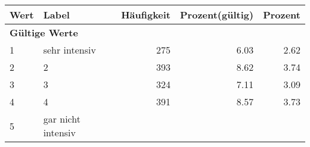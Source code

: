      \begin{longtable}{lXrrr}
     \toprule
     \textbf{Wert} & \textbf{Label} & \textbf{Häufigkeit} & \textbf{Prozent(gültig)} & \textbf{Prozent} \\
     \endhead
     \midrule
     \multicolumn{5}{l}{\textbf{Gültige Werte}}\\

     1 &
     \multicolumn{1}{X}{ sehr intensiv   } &


       \num{275} &
       \num[round-mode=places,round-precision=2]{6,03} &
         \num[round-mode=places,round-precision=2]{2,62} \\

     2 &
     \multicolumn{1}{X}{ 2   } &


       \num{393} &
       \num[round-mode=places,round-precision=2]{8,62} &
         \num[round-mode=places,round-precision=2]{3,74} \\

     3 &
     \multicolumn{1}{X}{ 3   } &


       \num{324} &
       \num[round-mode=places,round-precision=2]{7,11} &
         \num[round-mode=places,round-precision=2]{3,09} \\

     4 &
     \multicolumn{1}{X}{ 4   } &


       \num{391} &
       \num[round-mode=places,round-precision=2]{8,57} &
         \num[round-mode=places,round-precision=2]{3,73} \\

     5 &
     \multicolumn{1}{X}{ gar nicht intensiv   } &



\end{longtable}
